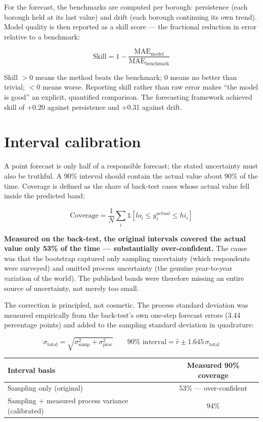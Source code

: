 \documentclass[ %
                    author={Ashrey Ashrey, Sanya Kapoor, Trisha Sharma, Yash Bhooshan Pandloskar},
                supervisor={Dr. Dalila O’Grady},
                    degree={MSc},
                     title={Using machine learning to forecast physical activity participation, volunteering and activity patterns in London},
                  subtitle={},
                      type={},
                      year={2021}]{dissertation}
\begin{document}
For the forecast, the benchmarks are computed per borough: persistence (each borough held at its last value) and drift (each borough continuing its own trend). Model quality is then reported as a skill score --- the fractional reduction in error relative to a benchmark:

\[
\mathrm{Skill}
=
1-
\frac{\mathrm{MAE}_{\mathrm{model}}}
{\mathrm{MAE}_{\mathrm{benchmark}}}
\]

Skill \(>0\) means the method beats the benchmark; 0 means no better than trivial; \(<0\) means worse. Reporting skill rather than raw error makes ``the model is good'' an explicit, quantified comparison. The forecasting framework achieved skill of +0.20 against persistence and +0.31 against drift.

\section{Interval calibration}

\noindent
A point forecast is only half of a responsible forecast; the stated uncertainty must also be truthful. A 90\% interval should contain the actual value about 90\% of the time. Coverage is defined as the share of back-test cases whose actual value fell inside the predicted band:

\[
\mathrm{Coverage}
=
\frac{1}{N}
\sum_i
\mathbb{1}
\left[
lo_i \leq y_i^{actual} \leq hi_i
\right]
\]

\noindent
\textbf{Measured on the back-test, the original intervals covered the actual value only 53\% of the time --- substantially over-confident.} The cause was that the bootstrap captured only sampling uncertainty (which respondents were surveyed) and omitted process uncertainty (the genuine year-to-year variation of the world). The published bands were therefore missing an entire source of uncertainty, not merely too small.

The correction is principled, not cosmetic. The process standard deviation was measured empirically from the back-test's own one-step forecast errors (3.44 percentage points) and added to the sampling standard deviation in quadrature:

\[
\sigma_{\mathrm{total}}
=
\sqrt{\sigma_{\mathrm{samp}}^2+\sigma_{\mathrm{proc}}^2}
\qquad
90\% \text{ interval}
=
\hat{r}
\pm
1.645\,\sigma_{\mathrm{total}}
\]

\begin{table}[!htb]
\centering
\begin{tabular}{lc}
\toprule
\textbf{Interval basis} & \textbf{Measured 90\% coverage} \\
\midrule
Sampling only (original) & 53\% --- over-confident \\
Sampling + measured process variance (calibrated) & 94\% \\
\bottomrule
\end{tabular}
\end{table}
\end{document}
